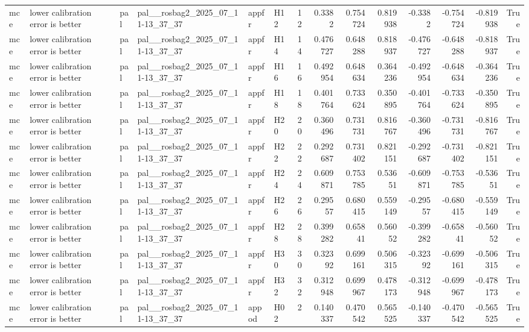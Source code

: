 \begin{longtable}{llllllrrrrrrrr}
mce & lower calibration error is better & pal & pal\_\_rosbag2\_2025\_07\_11-13\_37\_37 & appfr & H12 & 12 & 0.3382 & 0.754724 & 0.819938 & -0.3382 & -0.754724 & -0.819938 & True \\
mce & lower calibration error is better & pal & pal\_\_rosbag2\_2025\_07\_11-13\_37\_37 & appfr & H14 & 14 & 0.476727 & 0.648288 & 0.818937 & -0.476727 & -0.648288 & -0.818937 & True \\
mce & lower calibration error is better & pal & pal\_\_rosbag2\_2025\_07\_11-13\_37\_37 & appfr & H16 & 16 & 0.492954 & 0.648634 & 0.364236 & -0.492954 & -0.648634 & -0.364236 & True \\
mce & lower calibration error is better & pal & pal\_\_rosbag2\_2025\_07\_11-13\_37\_37 & appfr & H18 & 18 & 0.401764 & 0.733624 & 0.350895 & -0.401764 & -0.733624 & -0.350895 & True \\
mce & lower calibration error is better & pal & pal\_\_rosbag2\_2025\_07\_11-13\_37\_37 & appfr & H20 & 20 & 0.360496 & 0.731731 & 0.816767 & -0.360496 & -0.731731 & -0.816767 & True \\
mce & lower calibration error is better & pal & pal\_\_rosbag2\_2025\_07\_11-13\_37\_37 & appfr & H22 & 22 & 0.292687 & 0.731402 & 0.821151 & -0.292687 & -0.731402 & -0.821151 & True \\
mce & lower calibration error is better & pal & pal\_\_rosbag2\_2025\_07\_11-13\_37\_37 & appfr & H24 & 24 & 0.609871 & 0.753785 & 0.53651 & -0.609871 & -0.753785 & -0.53651 & True \\
mce & lower calibration error is better & pal & pal\_\_rosbag2\_2025\_07\_11-13\_37\_37 & appfr & H26 & 26 & 0.29557 & 0.680415 & 0.559149 & -0.29557 & -0.680415 & -0.559149 & True \\
mce & lower calibration error is better & pal & pal\_\_rosbag2\_2025\_07\_11-13\_37\_37 & appfr & H28 & 28 & 0.399282 & 0.65841 & 0.56052 & -0.399282 & -0.65841 & -0.56052 & True \\
mce & lower calibration error is better & pal & pal\_\_rosbag2\_2025\_07\_11-13\_37\_37 & appfr & H30 & 30 & 0.32392 & 0.699161 & 0.506315 & -0.32392 & -0.699161 & -0.506315 & True \\
mce & lower calibration error is better & pal & pal\_\_rosbag2\_2025\_07\_11-13\_37\_37 & appfr & H32 & 32 & 0.312948 & 0.699967 & 0.478173 & -0.312948 & -0.699967 & -0.478173 & True \\
mce & lower calibration error is better & pal & pal\_\_rosbag2\_2025\_07\_11-13\_37\_37 & appod & H02 & 2 & 0.140337 & 0.470542 & 0.565525 & -0.140337 & -0.470542 & -0.565525 & True \\

\end{longtable}

